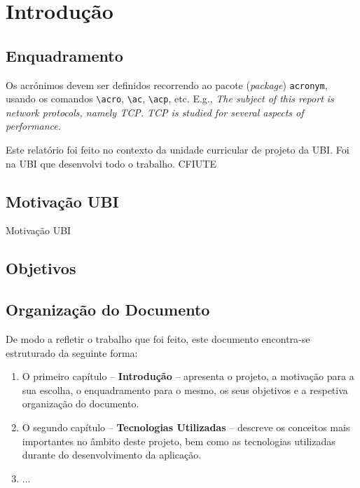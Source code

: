 \chapter{Introdução}
\label{chap:intro}

\section{Enquadramento}
\label{sec:amb} %

Os acrónimos devem ser definidos recorrendo ao pacote (\emph{package}) \texttt{acronym}, usando os comandos \texttt{\textbackslash acro}, \texttt{\textbackslash ac}, \texttt{\textbackslash acp}, etc. E.g., \emph{The subject of this report is network protocols, namely \ac{TCP}.  \ac{TCP} is studied for several aspects of performance.}

Este relatório foi feito no contexto da unidade curricular de projeto da \ac{UBI}. Foi na \ac{UBI} que desenvolvi todo o trabalho. \ac{CFIUTE}
                                                                             


\section{Motivação \acs*{UBI}}
Motivação UBI 
\label{sec:mot}

\section{Objetivos}
\label{sec:obj}

\section{Organização do Documento}
\label{sec:organ}
De modo a refletir o trabalho que foi feito, este documento encontra-se estruturado da seguinte forma:
\begin{enumerate}
\item O primeiro capítulo -- \textbf{Introdução} -- apresenta o projeto, a motivação para a sua escolha, o enquadramento para o mesmo, os seus objetivos e a respetiva organização do documento.
\item O segundo capítulo -- \textbf{Tecnologias Utilizadas} -- descreve os conceitos mais importantes no âmbito deste projeto, bem como as tecnologias utilizadas durante do desenvolvimento da aplicação.
\item ...
\end{enumerate}

